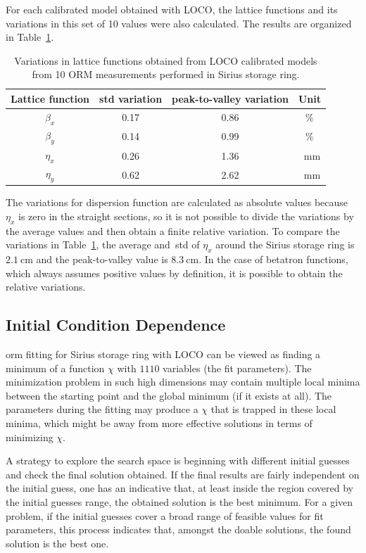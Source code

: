 For each calibrated model obtained with LOCO, the lattice functions and its variations in this set of 10 values were also calculated. The results are organized in Table~\ref{tab:twiss_var}. 
\begin{table}
    \centering
    \caption{Variations in lattice functions obtained from LOCO calibrated models from 10 ORM measurements performed in Sirius storage ring.}
    \label{tab:twiss_var}
    \begin{tabular}{cccc}
        \toprule\toprule
        Lattice function & std variation & peak-to-valley variation & Unit \\
        \hline
        $\beta_x$ & \num{0.17}& \num{0.86} & \%\\
        $\beta_y$ & \num{0.14} & \num{0.99}& \% \\
        $\eta_x$ & \num{0.26} & \num{1.36} & \SI{}{\milli\meter}\\
        $\eta_y$ & \num{0.62} & \num{2.62} & \SI{}{\milli\meter} \\
        \bottomrule\bottomrule
    \end{tabular}
\end{table}

The variations for dispersion function are calculated as absolute values because $\eta_x$ is zero in the straight sections, so it is not possible to divide the variations by the average values and then obtain a finite relative variation. To compare the variations in Table~\ref{tab:twiss_var}, the average and~\gls{std} of $\eta_x$ around the Sirius storage ring is $\SI{2.1}{\cm}$ and the peak-to-valley value is $\SI{8.3}{\cm}$. In the case of betatron functions, which always assumes positive values by definition, it is possible to obtain the relative variations.

\subsection{Initial Condition Dependence}
\gls{orm} fitting for Sirius storage ring with LOCO can be viewed as finding a minimum of a function $\chi$ with $1110$ variables (the fit parameters). The minimization problem in such high dimensions may contain multiple local minima between the starting point and the global minimum (if it exists at all). The parameters during the fitting may produce a $\chi$ that is trapped in these local minima, which might be away from more effective solutions in terms of minimizing $\chi$.

A strategy to explore the search space is beginning with different initial guesses and check the final solution obtained. If the final results are fairly independent on the initial guess, one has an indicative that, at least inside the region covered by the initial guesses range, the obtained solution is the best minimum. For a given problem, if the initial guesses cover a broad range of feasible values for fit parameters, this process indicates that, amongst the doable solutions, the found solution is the best one.

